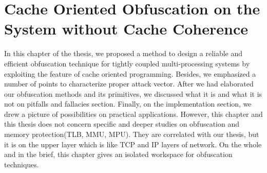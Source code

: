\chapter{Cache Oriented Obfuscation on the System without Cache Coherence}

In this chapter of the thesis, we proposed a method to design a reliable and efficient obfuscation technique for tightly coupled multi-processing systems by exploiting the feature of cache oriented programming. Besides, we emphasized a number of points to characterize proper attack vector. After we had elaborated our obfuscation methods and its primitives, we discussed what it is and what it is not on pitfalls and fallacies section. Finally, on the implementation section, we drew a picture of possibilities on practical applications. However, this chapter and this thesis does not concern specific and deeper studies on obfuscation and memory protection(TLB, MMU, MPU). They are correlated with our thesis, but it is on the upper layer which is like TCP and IP layers of network. On the whole and in the brief, this chapter gives an isolated workspace for obfuscation techniques.

